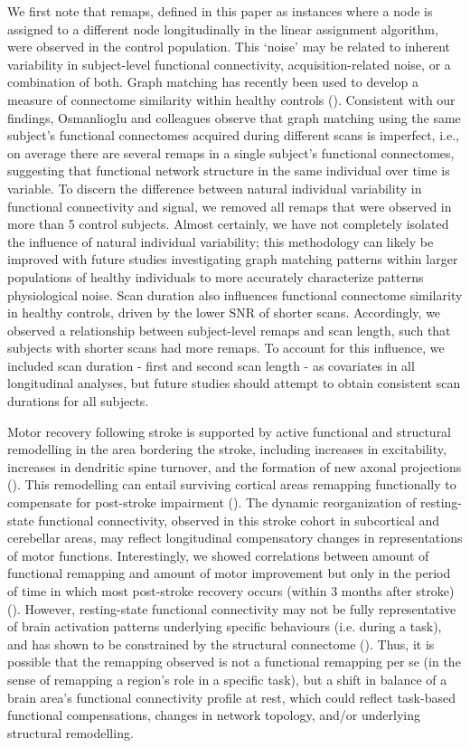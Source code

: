 \documentclass[phd,tocprelim]{cornell}
\begin{document}
	We first note that remaps, defined in this paper as instances where a node is assigned to a different node longitudinally in the linear assignment algorithm, were observed in the control population. This ‘noise’ may be related to inherent variability in subject-level functional connectivity, acquisition-related noise, or a combination of both. Graph matching has recently been used to develop a measure of connectome similarity within healthy controls (\cite{Osmanlioglu2020-xz}). Consistent with our findings, Osmanlioglu and colleagues observe that graph matching using the same subject’s functional connectomes acquired during different scans is imperfect, i.e., on average there are several remaps in a single subject’s functional connectomes, suggesting that functional network structure in the same individual over time is variable. To discern the difference between natural individual variability in functional connectivity and signal, we removed all remaps that were observed in more than 5 control subjects. Almost certainly, we have not completely isolated the influence of natural individual variability; this methodology can likely be improved with future studies investigating graph matching patterns within larger populations of healthy individuals to more accurately characterize patterns physiological noise. Scan duration also influences functional connectome similarity in healthy controls, driven by the lower SNR of shorter scans. Accordingly, we observed a relationship between subject-level remaps and scan length, such that subjects with shorter scans had more remaps. To account for this influence, we included scan duration - first and second scan length - as covariates in all longitudinal analyses, but future studies should attempt to obtain consistent scan durations for all subjects.
	
    Motor recovery following stroke is supported by active functional and structural remodelling in the area bordering the stroke, including increases in excitability, increases in dendritic spine turnover, and the formation of new axonal projections (\cite{Murphy2009-ez}). This remodelling can entail surviving cortical areas remapping functionally to compensate for post-stroke impairment (\cite{Brown2009-jn}). The dynamic reorganization of resting-state functional connectivity, observed in this stroke cohort in subcortical and cerebellar areas, may reflect longitudinal compensatory changes in representations of motor functions. Interestingly, we showed correlations between amount of functional remapping and amount of motor improvement but only in the period of time in which most post-stroke recovery occurs (within 3 months after stroke) (\cite{Lee2015-nn}). However, resting-state functional connectivity may not be fully representative of brain activation patterns underlying specific behaviours (i.e. during a task), and has shown to be constrained by the structural connectome (\cite{Kuceyeski2019-gt, Honey2009-xb}). Thus, it is possible that the remapping observed is not a functional remapping per se (in the sense of remapping a region's role in a specific task), but a shift in balance of a brain area's functional connectivity profile at rest, which could reflect task-based functional compensations, changes in network topology, and/or underlying structural remodelling. 
\end{document}
